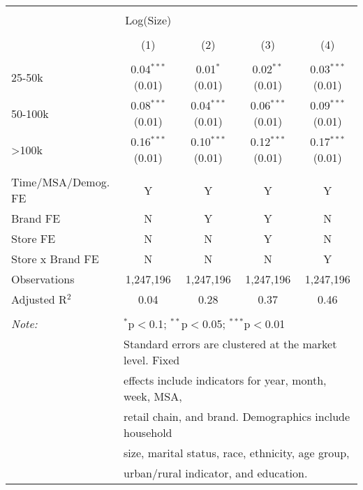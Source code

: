 
\begin{table}[!htbp] \centering 
  \caption{} 
  \label{tab:packageSizeFull7265} 
\begin{tabular}{@{\extracolsep{5pt}}lcccc} 
\\[-1.8ex]\hline 
\hline \\[-1.8ex] 
 & Log(Size) &  &  &  \\ 
\\[-1.8ex] & (1) & (2) & (3) & (4)\\ 
\hline \\[-1.8ex] 
 25-50k & 0.04$^{***}$ (0.01) & 0.01$^{*}$ (0.01) & 0.02$^{**}$ (0.01) & 0.03$^{***}$ (0.01) \\ 
  50-100k & 0.08$^{***}$ (0.01) & 0.04$^{***}$ (0.01) & 0.06$^{***}$ (0.01) & 0.09$^{***}$ (0.01) \\ 
  >100k & 0.16$^{***}$ (0.01) & 0.10$^{***}$ (0.01) & 0.12$^{***}$ (0.01) & 0.17$^{***}$ (0.01) \\ 
 \hline \\[-1.8ex] 
Time/MSA/Demog. FE & Y & Y & Y & Y \\ 
Brand FE & N & Y & Y & N \\ 
Store FE & N & N & Y & N \\ 
Store x Brand FE & N & N & N & Y \\ 
Observations & 1,247,196 & 1,247,196 & 1,247,196 & 1,247,196 \\ 
Adjusted R$^{2}$ & 0.04 & 0.28 & 0.37 & 0.46 \\ 
\hline 
\hline \\[-1.8ex] 
\textit{Note:}  & \multicolumn{4}{l}{$^{*}$p$<$0.1; $^{**}$p$<$0.05; $^{***}$p$<$0.01} \\ 
 & \multicolumn{4}{l}{Standard errors are clustered at the market level. Fixed } \\ 
 & \multicolumn{4}{l}{effects include indicators for year, month, week, MSA, } \\ 
 & \multicolumn{4}{l}{retail chain, and brand. Demographics include household } \\ 
 & \multicolumn{4}{l}{size, marital status, race, ethnicity, age group, } \\ 
 & \multicolumn{4}{l}{urban/rural indicator, and education.} \\ 
\end{tabular} 
\end{table} 
